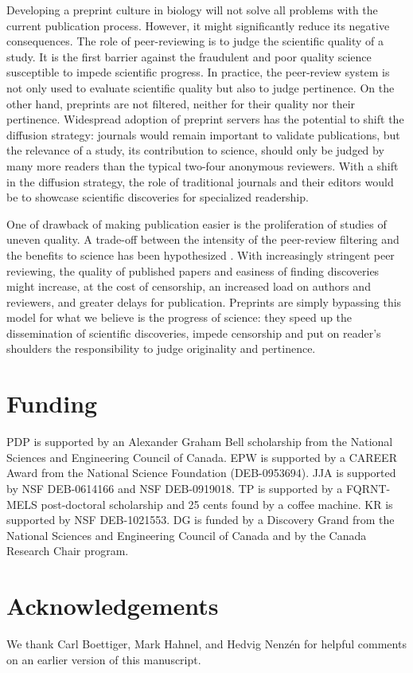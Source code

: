 \documentclass[letterpaper,twocolumn,superscriptaddress,showkeys,longbibliography]{revtex4-1}
\begin{document}
Developing a preprint culture in biology will not solve all problems with the
current publication process. However, it might significantly reduce its negative
consequences. The role of peer-reviewing is to judge the scientific quality of a
study. It is the first barrier against the fraudulent and poor quality science
susceptible to impede scientific progress. In practice, the peer-review system
is not only used to evaluate scientific quality but also to judge pertinence. On
the other hand, preprints are not filtered, neither for their quality nor their
pertinence. Widespread adoption of preprint servers has the potential to shift
the diffusion strategy: journals would remain important to validate
publications, but the relevance of a study, its contribution to science, should
only be judged by many more readers than the typical two-four anonymous
reviewers. With a shift in the diffusion strategy, the role of traditional
journals and their editors would be to showcase scientific discoveries for
specialized readership. 

One of drawback of making publication easier is the proliferation of studies of
uneven quality. A trade-off between the intensity of the peer-review filtering
and the benefits to science has been hypothesized \cite{Aarssen2012}.  With
increasingly stringent peer reviewing, the quality of published papers and
easiness of finding discoveries might increase, at the cost of censorship, an
increased load on authors and reviewers, and greater delays for publication.
Preprints are simply bypassing this model for what we believe is the progress of
science: they speed up the dissemination of scientific discoveries, impede
censorship and put on reader's shoulders the responsibility to judge originality
and pertinence.

\section{Funding}

PDP is supported by an Alexander Graham Bell scholarship from the National
Sciences and Engineering Council of Canada. EPW is supported by a CAREER Award
from the National Science Foundation (DEB-0953694). JJA is supported by NSF
DEB-0614166 and NSF DEB-0919018.  TP is supported by a FQRNT-MELS post-doctoral
scholarship and 25 cents found by a coffee machine.  KR is supported by NSF
DEB-1021553. DG is funded by a Discovery Grand from the National Sciences and
Engineering Council of Canada and by the Canada Research Chair program.

\section{Acknowledgements}

We thank Carl Boettiger, Mark Hahnel, and Hedvig Nenz\'en for helpful comments
on an earlier version of this manuscript.

\newpage

\end{document}
